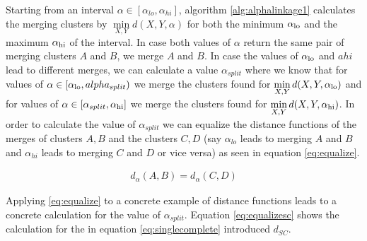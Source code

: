 Starting from an interval $\alpha \in [\alpha_{lo}, \alpha_{hi}]$, algorithm \ref{alg:alphalinkage1} calculates the merging clusters by $\min\limits_{X, Y} d(X,Y,\alpha)$ for both the minimum $\alpha_\text{lo}$ and the maximum $\alpha_\text{hi}$ of the interval. In case both values of $\alpha$ return the same pair of merging clusters $A$ and $B$, we merge $A$ and $B$. In case the values of $\alpha_\text{lo}$ and $ahi$ lead to different merges, we can calculate a value $\alpha_{split}$ where we know that for values of $\alpha \in [\alpha_\text{lo}, alpha_{split})$ we merge the clusters found for $\min\limits_{X, Y} d(X,Y,\alpha_\text{lo})$ and for values of $\alpha \in [\alpha_{split}, \alpha_\text{hi}]$ we merge the clusters found for $\min\limits_{X, Y} d(X,Y,\alpha_\text{hi})$. In order to calculate the value of $\alpha_{split}$ we can equalize the distance functions of the merges of clusters $A, B$ and the clusters $C, D$ (say $\alpha_{lo}$ leads to merging $A$ and $B$ and $\alpha_{hi}$ leads to merging $C$ and $D$ or vice versa) as seen in equation \ref{eq:equalize}. 

\begin{equation}
    \begin{aligned}
        d_{\alpha}(A,B) = d_{\alpha}(C,D)
    \end{aligned}
    \label{eq:equalize}
\end{equation}

Applying \ref{eq:equalize} to a concrete example of distance functions leads to a concrete calculation for the value of $\alpha_{split}$. Equation \ref{eq:equalizesc} shows the calculation for the in equation \ref{eq:singlecomplete} introduced $d_{SC}$.

